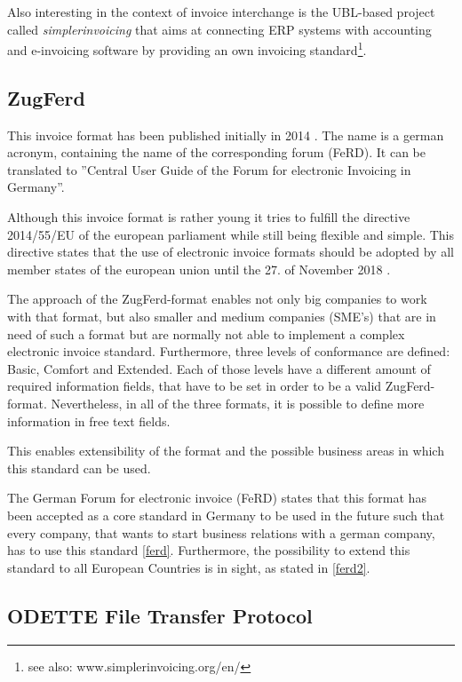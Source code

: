 Also interesting in the context of invoice interchange is the UBL-based project called \emph{simplerinvoicing} that aims at connecting ERP systems with accounting and e-invoicing software by providing an own invoicing standard\footnote {see also: www.simplerinvoicing.org/en/}. 

\subsection{ZugFerd}
\label{sec2.1.4}

This invoice format has been published initially in 2014 \cite{ferdIntro}. The name is a german acronym, containing the name of the corresponding forum (FeRD). It can be translated to ''Central User Guide of the Forum for electronic Invoicing in Germany''. 

Although this invoice format is rather young it tries to fulfill the directive 2014/55/EU of the european parliament \cite{dir1455} while still being flexible and simple. This directive states that the use of electronic invoice formats should be adopted by all member states of the european union until the 27. of November 2018 \cite{dir1455, Article 11}. 
 
The approach of the ZugFerd-format enables not only big companies to work with that format, but also smaller and medium companies (SME's) that are in need of such a format but are normally not able to implement a complex electronic invoice standard. 
Furthermore, three levels of conformance are defined: Basic, Comfort and Extended. Each of those levels have a different amount of required information fields, that have to be set in order to be a valid ZugFerd-format. Nevertheless, in all of the three formats, it is possible to define more information in free text fields. 

This enables extensibility of the format and the possible business areas in which this standard can be used.

The German Forum for electronic invoice (FeRD) states that this format has been accepted as a core standard in Germany to be used in the future such that every company, that wants to start business relations with a german company, has to use this standard \ref{ferd}. Furthermore, the possibility to extend this standard to all European Countries is in sight, as stated in \ref{ferd2}.

\subsection{ODETTE File Transfer Protocol}
\label{sec2.1.5}

